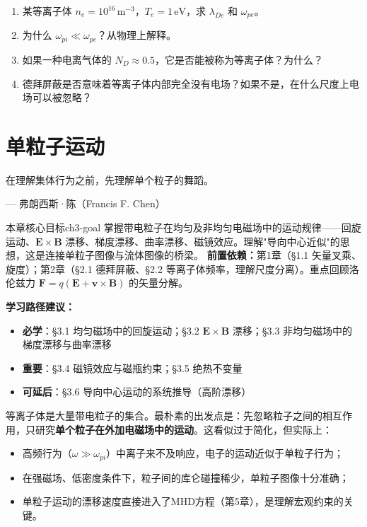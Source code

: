 \documentclass[12pt,a4paper,openany,oneside]{book}
\newcommand{\vect}[1]{\bm{#1}}
\begin{document}
\begin{miniquiz}
\begin{enumerate}
\item 某等离子体 $n_e = 10^{16}\,\mathrm{m}^{-3}$，$T_e = 1\,\mathrm{eV}$，求 $\lambda_{De}$ 和 $\omega_{pe}$。
\item 为什么 $\omega_{pi} \ll \omega_{pe}$？从物理上解释。
\item 如果一种电离气体的 $N_D \approx 0.5$，它是否能被称为等离子体？为什么？
\item 德拜屏蔽是否意味着等离子体内部完全没有电场？如果不是，在什么尺度上电场可以被忽略？
\end{enumerate}
\end{miniquiz}




\chapter{单粒子运动}\label{ch:3}
\epigraph{在理解集体行为之前，先理解单个粒子的舞蹈。}{--- 弗朗西斯·陈（Francis F. Chen）}

\begin{insight}{本章核心目标}{ch3-goal}
掌握带电粒子在均匀及非均匀电磁场中的运动规律——回旋运动、$\vect{E}\times\vect{B}$ 漂移、梯度漂移、曲率漂移、磁镜效应。理解"导向中心近似"的思想，这是连接单粒子图像与流体图像的桥梁。
\tcblower
\textbf{前置依赖：}第1章（\S1.1 矢量叉乘、旋度）；第2章（\S2.1 德拜屏蔽、\S2.2 等离子体频率，理解尺度分离）。重点回顾洛伦兹力 $\vect{F}=q(\vect{E}+\vect{v}\times\vect{B})$ 的矢量分解。

\textbf{学习路径建议：}

\begin{itemize}[leftmargin=*]
\item[\textcolor{red}{$\blacksquare$}] \textbf{必学}：\S3.1 均匀磁场中的回旋运动；\S3.2 $\vect{E}\times\vect{B}$ 漂移；\S3.3 非均匀磁场中的梯度漂移与曲率漂移
\item[\textcolor{orange}{$\blacksquare$}] \textbf{重要}：\S3.4 磁镜效应与磁瓶约束；\S3.5 绝热不变量
\item[\textcolor{green}{$\blacksquare$}] \textbf{可延后}：\S3.6 导向中心运动的系统推导（高阶漂移）
\end{itemize}
\end{insight}

等离子体是大量带电粒子的集合。最朴素的出发点是：先忽略粒子之间的相互作用，只研究\textbf{单个粒子在外加电磁场中的运动}。这看似过于简化，但实际上：
\begin{itemize}
\item 高频行为（$\omega \gg \omega_{pi}$）中离子来不及响应，电子的运动近似于单粒子行为；
\item 在强磁场、低密度条件下，粒子间的库仑碰撞稀少，单粒子图像十分准确；
\item 单粒子运动的漂移速度直接进入了MHD方程（第5章），是理解宏观约束的关键。
\end{itemize}
\end{document}
